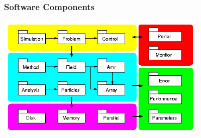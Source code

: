     \begin{frame}[fragile] \frametitle{Software Components}
\centerline{\includegraphics[width=4in]{components.png}}
\end{frame}
